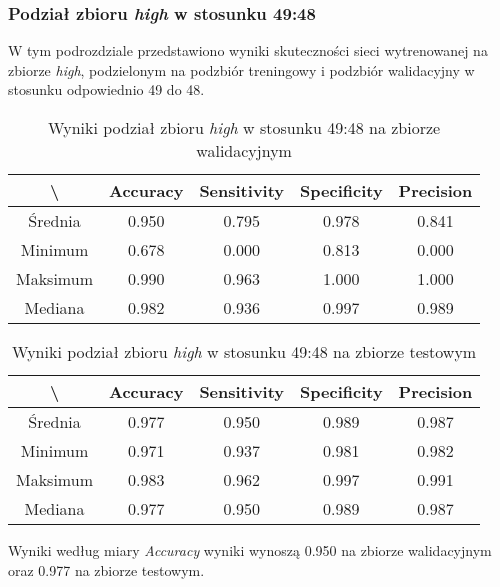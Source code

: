 \subsubsection{Podział zbioru \textit{high} w stosunku 49:48}

W tym podrozdziale przedstawiono wyniki skuteczności sieci wytrenowanej na zbiorze \textit{high}, podzielonym na podzbiór treningowy i podzbiór walidacyjny w stosunku odpowiednio 49 do 48.

\begin{table}[H]
	\centering
	\caption{Wyniki podział zbioru \textit{high} w stosunku 49:48 na zbiorze walidacyjnym}
	\vspace{6pt}
	{\footnotesize
		\begin{tabular}{|c|c|c|c|c|}
      \hline \textbackslash & Accuracy & Sensitivity & Specificity & Precision \\
      \hline Średnia & 0.950 & 0.795 & 0.978 & 0.841 \\
      \hline Minimum & 0.678 & 0.000 & 0.813 & 0.000 \\
      \hline Maksimum & 0.990 & 0.963 & 1.000 & 1.000 \\
      \hline Mediana & 0.982 & 0.936 & 0.997 & 0.989 \\
      \hline
		\end{tabular}
	}
	\vspace{0pt}
\end{table}

\begin{table}[H]
	\centering
	\caption{Wyniki podział zbioru \textit{high} w stosunku 49:48 na zbiorze testowym}
	\vspace{6pt}
	{\footnotesize
		\begin{tabular}{|c|c|c|c|c|}
      \hline \textbackslash & Accuracy & Sensitivity & Specificity & Precision \\
      \hline Średnia & 0.977 & 0.950 & 0.989 & 0.987 \\
      \hline Minimum & 0.971 & 0.937 & 0.981 & 0.982 \\
      \hline Maksimum & 0.983 & 0.962 & 0.997 & 0.991 \\
      \hline Mediana & 0.977 & 0.950 & 0.989 & 0.987 \\
      \hline
		\end{tabular}
	}
	\vspace{0pt}
\end{table}

Wyniki według miary \textit{Accuracy} wyniki wynoszą 0.950 na zbiorze walidacyjnym oraz 0.977 na zbiorze testowym.
